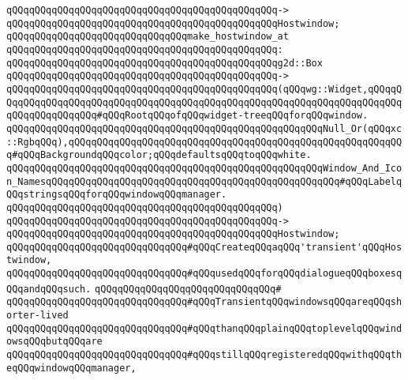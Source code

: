 \verb|qQQqqQQqqQQqqQQqqQQqqQQqqQQqqQQqqQQqqQQqqQQqqQQq->|\newline
\verb|qQQqqQQqqQQqqQQqqQQqqQQqqQQqqQQqqQQqqQQqqQQqqQQqHostwindow;|\newline
\newline
\verb|qQQqqQQqqQQqqQQqqQQqqQQqqQQqqQQqmake_hostwindow_at|\newline
\verb|qQQqqQQqqQQqqQQqqQQqqQQqqQQqqQQqqQQqqQQqqQQqqQQq:|\newline
\verb|qQQqqQQqqQQqqQQqqQQqqQQqqQQqqQQqqQQqqQQqqQQqqQQqg2d::Box|\newline
\verb|qQQqqQQqqQQqqQQqqQQqqQQqqQQqqQQqqQQqqQQqqQQqqQQq->|\newline
\verb|qQQqqQQqqQQqqQQqqQQqqQQqqQQqqQQqqQQqqQQqqQQqqQQq(qQQqwg::Widget,qQQqqQQqqQQqqQQqqQQqqQQqqQQqqQQqqQQqqQQqqQQqqQQqqQQqqQQqqQQqqQQqqQQqqQQqqQQqqQQqqQQqqQQqqQQq#qQQqRootqQQqofqQQqwidget-treeqQQqforqQQqwindow.|\newline
\verb|qQQqqQQqqQQqqQQqqQQqqQQqqQQqqQQqqQQqqQQqqQQqqQQqqQQqqQQqNull_Or(qQQqxc::RgbqQQq),qQQqqQQqqQQqqQQqqQQqqQQqqQQqqQQqqQQqqQQqqQQqqQQqqQQqqQQqqQQq#qQQqBackgroundqQQqcolor;qQQqdefaultsqQQqtoqQQqwhite.|\newline
\verb|qQQqqQQqqQQqqQQqqQQqqQQqqQQqqQQqqQQqqQQqqQQqqQQqqQQqqQQqWindow_And_Icon_NamesqQQqqQQqqQQqqQQqqQQqqQQqqQQqqQQqqQQqqQQqqQQqqQQqqQQq#qQQqLabelqQQqstringsqQQqforqQQqwindowqQQqmanager.|\newline
\verb|qQQqqQQqqQQqqQQqqQQqqQQqqQQqqQQqqQQqqQQqqQQqqQQq)|\newline
\verb|qQQqqQQqqQQqqQQqqQQqqQQqqQQqqQQqqQQqqQQqqQQqqQQq->|\newline
\verb|qQQqqQQqqQQqqQQqqQQqqQQqqQQqqQQqqQQqqQQqqQQqqQQqHostwindow;|\newline
\newline
\verb|qQQqqQQqqQQqqQQqqQQqqQQqqQQqqQQq#qQQqCreateqQQqaqQQq'transient'qQQqHostwindow,|\newline
\verb|qQQqqQQqqQQqqQQqqQQqqQQqqQQqqQQq#qQQqusedqQQqforqQQqdialogueqQQqboxesqQQqandqQQqsuch.|\newline
\verb|qQQqqQQqqQQqqQQqqQQqqQQqqQQqqQQq#|\newline
\verb|qQQqqQQqqQQqqQQqqQQqqQQqqQQqqQQq#qQQqTransientqQQqwindowsqQQqareqQQqshorter-lived|\newline
\verb|qQQqqQQqqQQqqQQqqQQqqQQqqQQqqQQq#qQQqthanqQQqplainqQQqtoplevelqQQqwindowsqQQqbutqQQqare|\newline
\verb|qQQqqQQqqQQqqQQqqQQqqQQqqQQqqQQq#qQQqstillqQQqregisteredqQQqwithqQQqtheqQQqwindowqQQqmanager,|\newline
